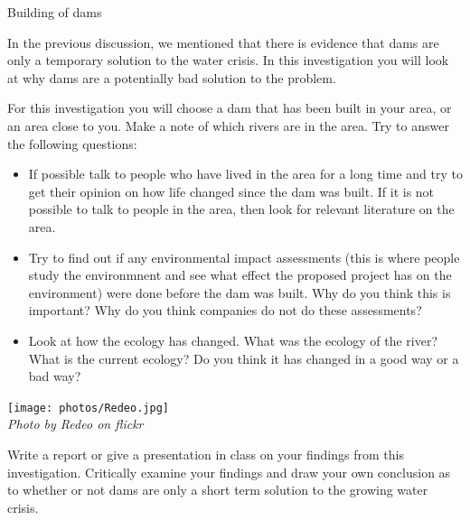 \par 
\label{m38138*id0123}
            \begin{Investigation}{Building of dams}
            \nopagebreak

\label{m38138*id0128031}In the previous discussion, we mentioned that there is evidence that dams are only a temporary solution to the water crisis. In this investigation you will look at why dams are a potentially bad solution to the problem. 
\par 
\label{m38138*id473692}For this investigation you will choose a dam that has been built in your area, or an area close to you. Make a note of which rivers are in the area. Try to answer the following questions: \\
\begin{minipage}{.7\textwidth}
\label{m38138*id774}\begin{itemize}[noitemsep]
            \label{m38138*id034582}\item If possible talk to people who have lived in the area for a long time and try to get their opinion on how life changed since the dam was built. If it is not possible to talk to people in the area, then look for relevant literature on the area.
\label{m38138*id08323}\item Try to find out if any environmental impact assessments (this is where people study the environmnent and see what effect the proposed project has on the environment) were done before the dam was built. Why do you think this is important? Why do you think companies do not do these assessments? 
\label{m38138*id0832346}\item 
Look at how the ecology has changed. What was the ecology of the river? What is the current ecology? Do you think it has changed in a good way or a bad way?
\end{itemize}
        \par 
\end{minipage}
\begin{minipage}{.3\textwidth}
 \begin{center}
  \texttt{[image: photos/Redeo.jpg]} \\
\textsl{Photo by Redeo on flickr}
 \end{center}

\end{minipage}
\label{m38138*id08322432}
Write a report or give a presentation in class on your findings from this investigation. Critically examine your findings and draw your own conclusion as to whether or not dams are only a short term solution to the growing water crisis.

\par \end{Investigation}
